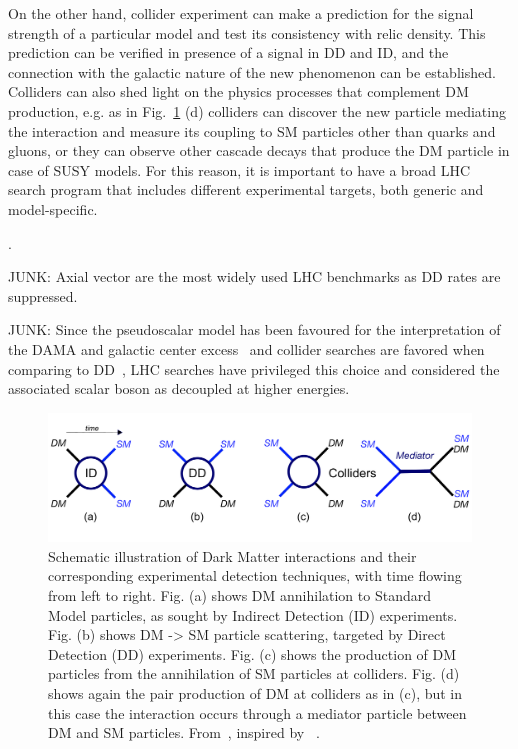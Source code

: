 On the other hand, collider experiment can make a prediction for the signal strength of a particular model and test its consistency with relic density. This prediction can be verified in presence of a signal in DD and ID, and the connection with the galactic nature of the new phenomenon can be established. Colliders can also shed light on the physics processes that complement DM production, e.g. as in Fig.~\ref{fig:Complementarity} (d) colliders can discover the new particle mediating the interaction and measure its coupling to SM particles other than quarks and gluons, or they can observe other cascade decays that produce the DM particle in case of SUSY models. For this reason, it is important to have a broad LHC search program that includes different experimental targets, both generic and model-specific.  %

\begin{marginnote}[]
\end{marginnote}. 

JUNK: Axial vector are the most widely used LHC benchmarks as DD rates are suppressed. 

JUNK: Since the pseudoscalar model has been favoured for the interpretation of the DAMA and galactic center excess~\cite{Arina:2014yna,Agrawal:2014una} and collider searches are favored when comparing to DD~\cite{Banerjee:2017wxi}, LHC searches have privileged this choice and considered the associated scalar boson as decoupled at higher energies. 


\begin{figure}[!htpb]
\includegraphics[width=\textwidth]{figures/EFTSimplifiedModels}
\caption{Schematic illustration of Dark Matter interactions and their corresponding experimental detection techniques, with time flowing from left to right. Fig. (a) shows DM annihilation to Standard Model particles, as sought by Indirect Detection (ID) experiments. Fig. (b) shows DM -> SM particle scattering, targeted by Direct Detection (DD) experiments. Fig. (c) shows the production of DM particles from the annihilation of SM particles at colliders. Fig. (d) shows again the pair production of DM at colliders as in (c), but in this case the interaction occurs through a mediator particle between DM and SM particles. From~\cite{monoXfig}, inspired by ~\cite{Bauer:2013ihz}.}
\label{fig:Complementarity}
\end{figure}

